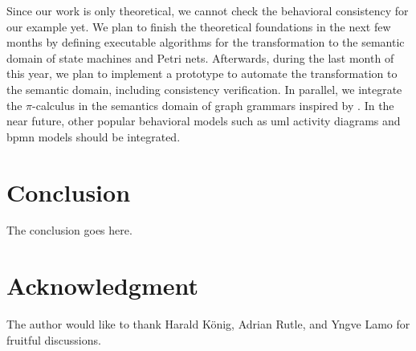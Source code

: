 \documentclass[conference]{IEEEtran}
\begin{document}
Since our work is only theoretical, we cannot check the behavioral consistency for our example yet.
We plan to finish the theoretical foundations in the next few months by defining executable algorithms for the transformation to the semantic domain of state machines and Petri nets.
Afterwards, during the last month of this year, we plan to implement a prototype to automate the transformation to the semantic domain, including consistency verification.
In parallel, we integrate the $\pi$-calculus in the semantics domain of graph grammars inspired by \cite{gadducciGraphRewritingPcalculus2007}.
In the near future, other popular behavioral models such as \gls{uml} activity diagrams and \gls{bpmn} models should be integrated. 


\section{Conclusion}

The conclusion goes here.

\section*{Acknowledgment}
The author would like to thank Harald König, Adrian Rutle, and Yngve Lamo for fruitful discussions.



\end{document}
